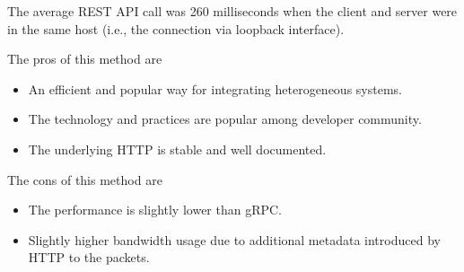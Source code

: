 The average REST API call was 260 milliseconds when the client and server were in the same host (i.e., the connection via loopback interface).

The pros of this method are
\begin{itemize}
	\item An efficient and popular way for integrating heterogeneous systems.
	\item The technology and practices are popular among developer community.
	\item The underlying HTTP is stable and well documented.
\end{itemize}

The cons of this method are
\begin{itemize}
	\item The performance is slightly lower than gRPC.
	\item Slightly higher bandwidth usage due to additional metadata introduced by HTTP to the packets.
\end{itemize}
\fi  %
